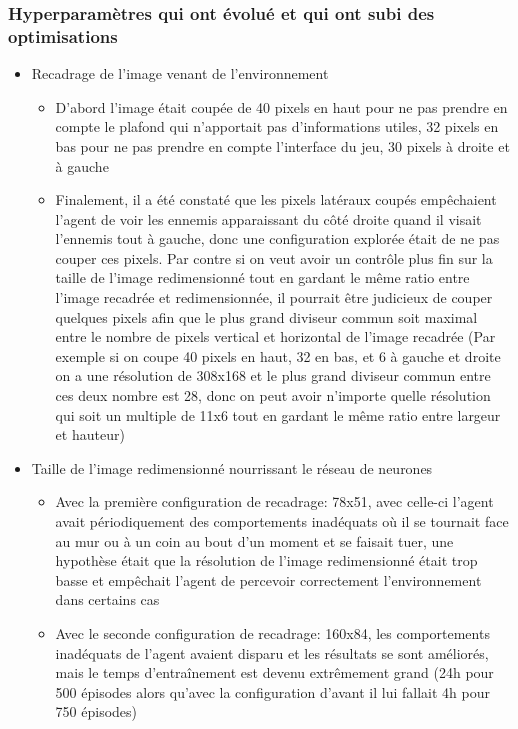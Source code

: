 \documentclass[a4paper,10pt,openany,oneside]{report}
\begin{document}
\subsubsection*{Hyperparamètres qui ont évolué et qui ont subi des optimisations}
\begin{itemize}
\item Recadrage de l'image venant de l'environnement
\begin{itemize}
	\item D'abord l'image était coupée de 40 pixels en haut pour ne pas prendre en compte le plafond qui n'apportait pas d'informations utiles, 32 pixels en bas pour ne pas prendre en compte l'interface du jeu, 30 pixels à droite et à gauche
	\item Finalement, il a été constaté que les pixels latéraux coupés empêchaient l'agent de voir les ennemis apparaissant du côté droite quand il visait l'ennemis tout à gauche, donc une configuration explorée était de ne pas couper ces pixels. Par contre si on veut avoir un contrôle plus fin sur la taille de l'image redimensionné tout en gardant le même ratio entre l'image recadrée et redimensionnée, il pourrait être judicieux de couper quelques pixels afin que le plus grand diviseur commun soit maximal entre le nombre de pixels vertical et horizontal de l'image recadrée (Par exemple si on coupe 40 pixels en haut, 32 en bas, et 6 à gauche et droite on a une résolution de 308x168 et le plus grand diviseur commun entre ces deux nombre est 28, donc on peut avoir n'importe quelle résolution qui soit un multiple de 11x6 tout en gardant le même ratio entre largeur et hauteur)
\end{itemize}
\item Taille de l'image redimensionné nourrissant le réseau de neurones
\begin{itemize}
	\item Avec la première configuration de recadrage: 78x51, avec celle-ci l'agent avait périodiquement des comportements inadéquats où il se tournait face au mur ou à un coin au bout d'un moment et se faisait tuer, une hypothèse était que la résolution de l'image redimensionné était trop basse et empêchait l'agent de percevoir correctement l'environnement dans certains cas
	\item Avec le seconde configuration de recadrage: 160x84, les comportements inadéquats de l'agent avaient disparu et les résultats se sont améliorés, mais le temps d'entraînement est devenu extrêmement grand (24h pour 500 épisodes alors qu'avec la configuration d'avant il lui fallait 4h pour 750 épisodes)

\end{itemize}
\end{itemize}
\end{document}
